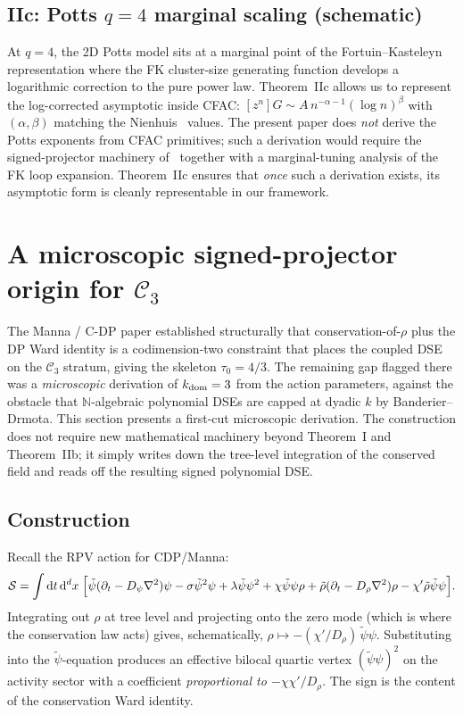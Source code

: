 \documentclass[11pt,a4paper]{article}
\newcommand{\dd}{\mathrm{d}}
\newcommand{\N}{\mathbb{N}}
\theoremstyle{plain}
\theoremstyle{definition}
\begin{document}
\subsection{IIc: Potts $q = 4$ marginal scaling (schematic)}

At $q = 4$, the 2D Potts model sits at a marginal point of the
Fortuin--Kasteleyn representation where the FK cluster-size
generating function develops a logarithmic correction to the pure
power law.  Theorem~IIc allows us to represent the
log-corrected asymptotic inside CFAC:
$[z^n] G \sim A\, n^{-\alpha-1}(\log n)^\beta$ with $(\alpha, \beta)$
matching the Nienhuis~\citep{Nienhuis1984} values.  The present
paper does \emph{not} derive the Potts exponents from CFAC
primitives; such a derivation would require the signed-projector
machinery of~\citep[\S 4]{AmarteifioManna2026} together with a
marginal-tuning analysis of the FK loop expansion.  Theorem~IIc
ensures that \emph{once} such a derivation exists, its asymptotic
form is cleanly representable in our framework.

\section{A microscopic signed-projector origin for $\mathcal{C}_3$}
\label{sec:signed-projector}

The Manna / C-DP paper \citep{AmarteifioManna2026} established
structurally that conservation-of-$\rho$ plus the DP Ward identity is
a codimension-two constraint that places the coupled DSE on the
$\mathcal{C}_3$ stratum, giving the skeleton $\tau_0 = 4/3$.  The
remaining gap flagged there was a \emph{microscopic} derivation of
$k_{\rm dom} = 3$ from the action parameters, against the obstacle
that $\N$-algebraic polynomial DSEs are capped at dyadic $k$ by
Banderier--Drmota.  This section presents a first-cut microscopic
derivation.  The construction does not require new mathematical
machinery beyond Theorem~I and Theorem~IIb; it simply writes down
the tree-level integration of the conserved field and reads off
the resulting signed polynomial DSE.

\subsection{Construction}

Recall the RPV action for CDP/Manna:
\[
  \mathcal{S}
   = \int \dd t\,\dd^d x\;\Bigl[
     \tilde\psi(\partial_t - D_\psi \nabla^2)\psi
     - \sigma \tilde\psi^2 \psi
     + \lambda \tilde\psi \psi^2
     + \chi \tilde\psi \psi \rho
     + \tilde\rho(\partial_t - D_\rho \nabla^2)\rho
     - \chi' \tilde\rho \tilde\psi \psi
   \Bigr].
\]
Integrating out $\rho$ at tree level and projecting onto the zero
mode (which is where the conservation law acts) gives, schematically,
$\rho \mapsto -(\chi'/D_\rho)\,\tilde\psi\psi$.  Substituting into
the $\tilde\psi$-equation produces an effective bilocal quartic
vertex $(\tilde\psi\psi)^2$ on the activity sector with a coefficient
\emph{proportional to $-\chi\chi'/D_\rho$}.  The sign is the content
of the conservation Ward identity.
\end{document}
